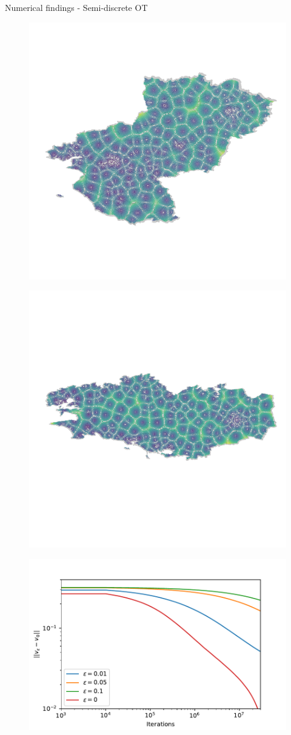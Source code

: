 \documentclass{beamer}
\begin{document}
\begin{frame}{Numerical findings - Semi-discrete OT}
    \begin{minipage}{.49\linewidth}
        \begin{figure}
            \includegraphics[width=.7\linewidth]{figures/opti_nantes.pdf}
        \end{figure}
        \begin{figure}
            \includegraphics[width=.7\linewidth]{figures/opti_rennes.pdf}
        \end{figure}
    \end{minipage}
    \begin{minipage}{.49\linewidth}
        \begin{figure}
            \includegraphics[width=.9\linewidth]{figures/semi_discrete_eps.pdf}

\end{figure}
\end{minipage}
\end{frame}
\end{document}
